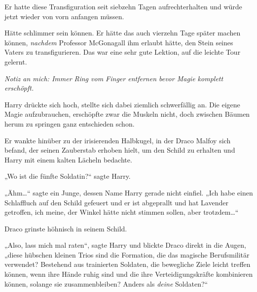 Er hatte diese Transfiguration seit siebzehn Tagen aufrechterhalten und würde jetzt wieder von vorn anfangen müssen.

Hätte schlimmer sein können. Er hätte das auch vierzehn Tage später machen können, \emph{nachdem} Professor McGonagall ihm erlaubt hätte, den Stein seines Vaters zu transfigurieren. Das war eine sehr gute Lektion, auf die leichte Tour gelernt.

\emph{Notiz an mich: Immer Ring vom Finger entfernen bevor Magie komplett erschöpft.}

Harry drückte sich hoch, stellte sich dabei ziemlich schwerfällig an. Die eigene Magie aufzubrauchen, erschöpfte zwar die Muskeln nicht, doch zwischen Bäumen herum zu springen ganz entschieden schon.

Er wankte hinüber zu der irisierenden Halbkugel, in der Draco Malfoy sich befand, der seinen Zauberstab erhoben hielt, um den Schild zu erhalten und Harry mit einem kalten Lächeln bedachte.

„Wo ist die fünfte Soldatin?“ sagte Harry.

„Ähm…“ sagte ein Junge, dessen Name Harry gerade nicht einfiel. „Ich habe einen Schlaffluch auf den Schild gefeuert und er ist abgeprallt und hat Lavender getroffen, ich meine, der Winkel hätte nicht stimmen sollen, aber trotzdem…“

Draco grinste höhnisch in seinem Schild.

„Also, lass mich mal raten“, sagte Harry und blickte Draco direkt in die Augen, „diese hübschen kleinen Trios sind die Formation, die das magische Berufsmilitär verwendet? Bestehend aus trainierten Soldaten, die bewegliche Ziele leicht treffen können, wenn ihre Hände ruhig sind und die ihre Verteidigungskräfte kombinieren können, solange sie zusammenbleiben? Anders als \emph{deine} Soldaten?“

